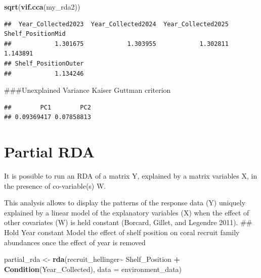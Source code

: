 \documentclass[
]{article}
\newenvironment{Shaded}{\begin{snugshade}}{\end{snugshade}}
\newcommand{\AttributeTok}[1]{\textcolor[rgb]{0.13,0.29,0.53}{#1}}
\newcommand{\FunctionTok}[1]{\textcolor[rgb]{0.13,0.29,0.53}{\textbf{#1}}}
\newcommand{\NormalTok}[1]{#1}
\newcommand{\OtherTok}[1]{\textcolor[rgb]{0.56,0.35,0.01}{#1}}
\newcommand{\SpecialCharTok}[1]{\textcolor[rgb]{0.81,0.36,0.00}{\textbf{#1}}}
\begin{document}
\begin{Shaded}
\begin{Highlighting}[]
\FunctionTok{sqrt}\NormalTok{(}\FunctionTok{vif.cca}\NormalTok{(my\_rda2))}
\end{Highlighting}
\end{Shaded}

\begin{verbatim}
##  Year_Collected2023  Year_Collected2024  Year_Collected2025   Shelf_PositionMid 
##            1.301675            1.303955            1.302811            1.143891 
## Shelf_PositionOuter 
##            1.134246
\end{verbatim}

\#\#\#Unexplained Variance Kaiser Guttman criterion

\begin{Shaded}
\end{Shaded}

\begin{verbatim}
##        PC1        PC2 
## 0.09369417 0.07858813
\end{verbatim}

\section{Partial RDA}\label{partial-rda}

It is possible to run an RDA of a matrix Y, explained by a matrix
variables X, in the presence of co-variable(s) W.

This analysis allows to display the patterns of the response data (Y)
uniquely explained by a linear model of the explanatory variables (X)
when the effect of other covariates (W) is held constant (Borcard,
Gillet, and Legendre 2011). \#\# Hold Year constant Model the effect of
shelf position on coral recruit family abundances once the effect of
year is removed

\begin{Shaded}
\begin{Highlighting}[]
\NormalTok{partial\_rda }\OtherTok{\textless{}{-}} \FunctionTok{rda}\NormalTok{(recruit\_hellinger}\SpecialCharTok{\textasciitilde{}}\NormalTok{ Shelf\_Position }\SpecialCharTok{+} \FunctionTok{Condition}\NormalTok{(Year\_Collected), }\AttributeTok{data =}\NormalTok{ environment\_data)}
\end{Highlighting}
\end{Shaded}
\end{document}

